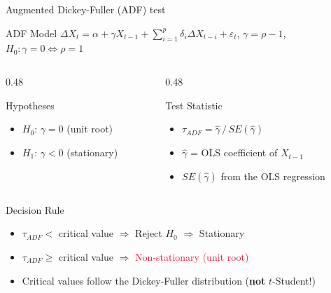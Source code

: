 \documentclass[9pt, aspectratio=169, t]{beamer}
\begin{document}
\begin{frame}{Augmented Dickey-Fuller (ADF) test}
    \vspace{-0.3cm}
    {\footnotesize
    \begin{block}{ADF Model}
    $\Delta X_t = \alpha + \gamma X_{t-1} + \sum_{i=1}^{p} \delta_i \Delta X_{t-i} + \varepsilon_t$, \;\;
    $\gamma = \rho - 1$, \; $H_0: \gamma = 0 \Leftrightarrow \rho = 1$
    \end{block}
    \vspace{-2mm}
    \begin{columns}[T]
        \begin{column}{0.48\textwidth}
            \begin{exampleblock}{Hypotheses}
                \begin{itemize}\setlength{\itemsep}{0pt}
                    \item \textbf{$H_0$}: $\gamma = 0$ (unit root)
                    \item \textbf{$H_1$}: $\gamma < 0$ (stationary)
                \end{itemize}
            \end{exampleblock}
        \end{column}
        \begin{column}{0.48\textwidth}
            \begin{block}{Test Statistic}
                \begin{itemize}\setlength{\itemsep}{0pt}
                    \item $\tau_{ADF} = \hat{\gamma}\, / \, SE(\hat{\gamma})$
                    \item $\hat{\gamma}$ = OLS coefficient of $X_{t-1}$
                    \item $SE(\hat{\gamma})$ from the OLS regression
                \end{itemize}
            \end{block}
        \end{column}
    \end{columns}
    \vspace{-1mm}
    \begin{alertblock}{Decision Rule}
        \begin{itemize}\setlength{\itemsep}{0pt}
            \item $\tau_{ADF} <$ critical value $\Rightarrow$ Reject $H_0$ $\Rightarrow$ \textcolor{Forest}{Stationary}
            \item $\tau_{ADF} \geq$ critical value $\Rightarrow$ \textcolor{Crimson}{Non-stationary (unit root)}
            \item Critical values follow the Dickey-Fuller distribution (\textbf{not} $t$-Student!)
        \end{itemize}
    \end{alertblock}
    }
\end{frame}
\end{document}
